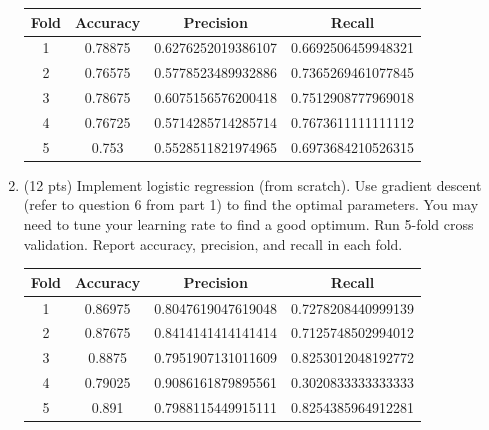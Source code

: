 \documentclass[a4paper]{article}
\theoremstyle{definition}
\newenvironment{soln}{
    \leavevmode\color{blue}\ignorespaces
}{}
\begin{document}
\begin{enumerate}
	      \begin{soln}
		      \begin{center}
			      \begin{tabular}{c c c c}
				      \hline
				      Fold & Accuracy & Precision          & Recall             \\ \hline
				      1    & 0.78875  & 0.6276252019386107 & 0.6692506459948321 \\
				      2    & 0.76575  & 0.5778523489932886 & 0.7365269461077845 \\
				      3    & 0.78675  & 0.6075156576200418 & 0.7512908777969018 \\
				      4    & 0.76725  & 0.5714285714285714 & 0.7673611111111112 \\
				      5    & 0.753    & 0.5528511821974965 & 0.6973684210526315 \\
				      \hline
			      \end{tabular}
		      \end{center}
	      \end{soln}


	\item (12 pts) Implement logistic regression (from scratch). Use gradient descent (refer to question 6 from part 1) to find the optimal parameters. You may need to tune your learning rate to find a good optimum. Run 5-fold cross validation. Report accuracy, precision, and recall in each fold.

	      \begin{soln}
		      \begin{center}
			      \begin{tabular}{c c c c}
				      \hline
				      Fold & Accuracy & Precision          & Recall             \\ \hline
				      1    & 0.86975  & 0.8047619047619048 & 0.7278208440999139 \\
				      2    & 0.87675  & 0.8414141414141414 & 0.7125748502994012 \\
				      3    & 0.8875   & 0.7951907131011609 & 0.8253012048192772 \\
				      4    & 0.79025  & 0.9086161879895561 & 0.3020833333333333 \\
				      5    & 0.891    & 0.7988115449915111 & 0.8254385964912281 \\
				      \hline
			      \end{tabular}
		      \end{center}
	      \end{soln}


\end{enumerate}
\end{document}
